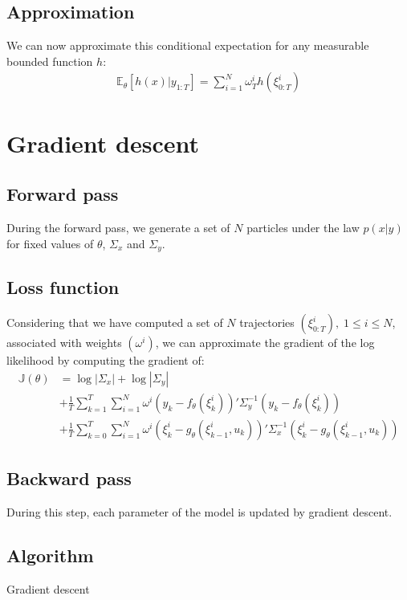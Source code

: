 \documentclass[10pt,a4paper]{report}
\begin{document}
\subsection{Approximation}
We can now approximate this conditional expectation for any measurable bounded function $h$:
\begin{align*}
        \mathbb{E}_\theta \left[ h(x) | y_{1:T} \right] = \sum_{i=1}^N \omega_T^i h(\xi_{0:T}^i)
\end{align*}

\section{Gradient descent}
\label{sec:gradient_descent}

\subsection{Forward pass}
During the forward pass, we generate a set of $N$ particles under the law $p(x|y)$ for fixed values of $\theta$, $\Sigma_x$ and $\Sigma_y$.

\subsection{Loss function}
Considering that we have computed a set of $N$ trajectories $(\xi^i_{0:T}),\;1 \leq i \leq N$, associated with weights $(\omega^i)$, we can approximate the gradient of the log likelihood by computing the gradient of:
\begin{align*}
        \mathbb{J}(\theta) & = \log |\Sigma_x| + \log |\Sigma_y|                                                                                                        \\
                           & + \frac{1}{T}\sum_{k=1}^T \sum_{i=1}^N \omega^i (y_k - f_\theta(\xi_k^i))' \Sigma_y^{-1} (y_k - f_\theta(\xi_k^i))                         \\
                           & + \frac{1}{T}\sum_{k=0}^T \sum_{i=1}^N \omega^i (\xi_k^i - g_\theta(\xi_{k-1}^i, u_k))'\Sigma_x^{-1}(\xi_k^i - g_\theta(\xi_{k-1}^i, u_k))
\end{align*}

\subsection{Backward pass}
During this step, each parameter of the model is updated by gradient descent.

\subsection{Algorithm}
\begin{algorithm}
        \caption{Gradient descent}
\end{algorithm}
\end{document}
